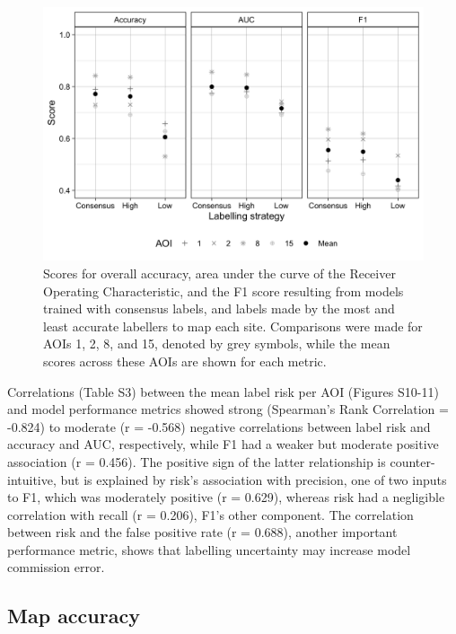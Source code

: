 \documentclass[11pt,a4paper]{article}
\begin{document}
\begin{figure}

{\centering \includegraphics[width=1\linewidth]{figures/figure5} 

}

\caption{Scores for overall accuracy, area under the curve of the Receiver Operating Characteristic, and the F1 score resulting from models trained with consensus labels, and labels made by the most and least accurate labellers to map each site. Comparisons were made for AOIs 1, 2, 8, and 15, denoted by grey symbols, while the mean scores across these AOIs are shown for each metric.}\label{fig:trainingimpact}
\end{figure}

Correlations (Table S3) between the mean label risk per AOI (Figures
S10-11) and model performance metrics showed strong (Spearman's Rank
Correlation = -0.824) to moderate (r = -0.568) negative correlations
between label risk and accuracy and AUC, respectively, while F1 had a
weaker but moderate positive association (r = 0.456). The positive sign
of the latter relationship is counter-intuitive, but is explained by
risk's association with precision, one of two inputs to F1, which was
moderately positive (r = 0.629), whereas risk had a negligible
correlation with recall (r = 0.206), F1's other component. The
correlation between risk and the false positive rate (r = 0.688),
another important performance metric, shows that labelling uncertainty
may increase model commission error.

\hypertarget{map-accuracy}{%
\subsection{Map accuracy}\label{map-accuracy}}
\end{document}
